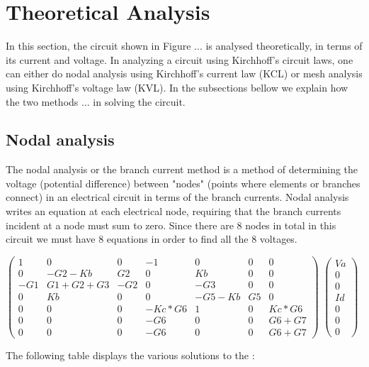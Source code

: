 \section{Theoretical Analysis}
\label{sec:analysis}

In this section, the circuit shown in Figure ... is analysed
theoretically, in terms of its current and voltage.
In analyzing a circuit using Kirchhoff's circuit laws, one can either do nodal analysis using Kirchhoff's current law (KCL) or mesh analysis using Kirchhoff's voltage law (KVL).
In the subsections bellow we explain how the two methods ... in solving the circuit. 


\subsection{Nodal analysis}
The nodal analysis or the branch current method is a method of determining the voltage (potential difference) between "nodes" (points where elements or branches connect) in an electrical circuit in terms of the branch currents. 
Nodal analysis writes an equation at each electrical node, requiring that the branch currents incident at a node must sum to zero.
Since there are 8 nodes in total in this circuit we must have 8 equations in order to find all the 8 voltages.


$\begin{pmatrix}
1 & 0 & 0 & -1 & 0 & 0 & 0 \\
0 & -G2-Kb & G2 & 0 & Kb & 0 & 0 \\
-G1 & G1+G2+G3 & -G2 & 0 & -G3 & 0 & 0 \\
0 & Kb & 0 & 0 & -G5-Kb & G5 & 0 \\
0 & 0 & 0 & -Kc*G6 & 1 & 0 & Kc*G6 \\
0 & 0 & 0 & -G6 & 0 & 0 & G6+G7 \\
0 & 0 & 0 & -G6 & 0 & 0 & G6+G7 
\end{pmatrix}$
$\begin{pmatrix}
Va\\
0\\
0\\
Id\\
0\\
0\\
0
\end{pmatrix}$

The following table displays the various solutions to the :

